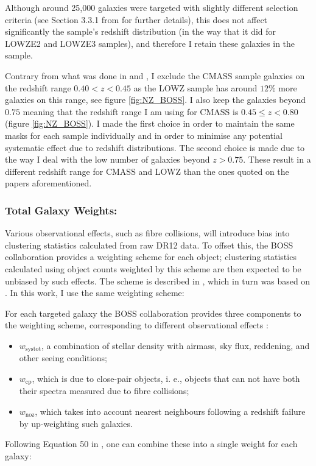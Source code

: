\qquad Although around 25,000 galaxies were targeted with slightly different selection criteria (see Section 3.3.1 from \cite{BOSSCatalogue2016} for further details), this does not affect significantly the sample's redshift distribution (in the way that it did for LOWZE2 and LOWZE3 samples), and therefore I retain these galaxies in the sample.

\qquad Contrary from what was done in \cite{BOSSCatalogue2016} and \cite{2016BOSSCosmology}, I exclude the CMASS sample galaxies on the redshift range $0.40<z<0.45$ as the LOWZ sample has around $12\%$ more galaxies on this range, see figure \ref{fig:NZ_BOSS}. I also keep the galaxies beyond $0.75$ meaning that the redshift range I am using for CMASS is $0.45 \leq z < 0.80$ (figure \ref{fig:NZ_BOSS}). I made the first choice in order to maintain the same masks for each sample individually and in order to minimise any potential systematic effect due to redshift distributions. The second choice is made due to the way I deal with the low number of galaxies beyond $ z > 0.75$. These result in a different redshift range for CMASS and LOWZ than the ones quoted on the papers aforementioned.

\subsubsection{Total Galaxy Weights:}\label{Sec:GalWeights}
Various observational effects, such as fibre collisions, will introduce bias into clustering statistics calculated from raw DR12 data. To offset this, the BOSS collaboration provides a weighting scheme for each object; clustering statistics calculated using object counts weighted by this scheme are then expected to be unbiased by such effects. The scheme is described in \cite{BOSSCatalogue2016}, which in turn was based on \cite{2014Anderson}. In this work, I use the same weighting scheme:

\qquad For each targeted galaxy the BOSS collaboration provides three components to the weighting scheme, corresponding to different observational effects \citep{BOSSCatalogue2016,2014Anderson}:
\begin{itemize}
\item{$w_{\text{systot}}$, a combination of stellar density with airmass, sky flux, reddening, and other seeing conditions;}
\item{$w_{\text{cp}}$, which is due to close-pair objects, i. e., objects that can not have both their spectra measured due to fibre collisions;}
\item{$w_{\text{noz}}$, which takes into account nearest neighbours following a redshift failure by up-weighting such galaxies.}
\end{itemize}
Following Equation 50 in \cite{BOSSCatalogue2016}, one can combine these into a single weight for each galaxy:

